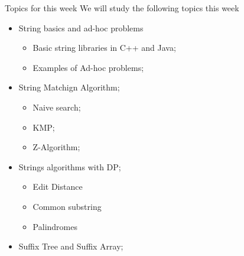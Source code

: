 \begin{frame}{Topics for this week}
  We will study the following topics this week
  \begin{itemize}
    \item String basics and ad-hoc problems
    \begin{itemize}
      \item Basic string libraries in C++ and Java;
      \item Examples of Ad-hoc problems;
    \end{itemize}
    \item String Matchign Algorithm;
    \begin{itemize}
      \item Naive search;
      \item KMP;
      \item Z-Algorithm;
    \end{itemize}
    \item Strings algorithms with DP;
    \begin{itemize}
      \item Edit Distance
      \item Common substring
      \item Palindromes
    \end{itemize}
    \item Suffix Tree and Suffix Array;
  \end{itemize}
\end{frame}




